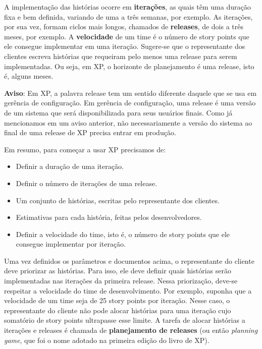 \documentclass[
  11pt,
  twoside]{book}
\begin{document}
 A implementação das histórias
ocorre em \textbf{iterações}, as quais têm uma duração fixa e bem
definida, variando de uma a três semanas, por exemplo. As iterações, por
sua vez, formam ciclos mais longos, chamados de \textbf{releases}, de
dois a três meses, por exemplo. A \textbf{velocidade} de um time é o
número de story points que ele consegue implementar em uma iteração.
Sugere-se que o representante dos clientes escreva histórias que
requeiram pelo menos uma release para serem implementadas. Ou seja, em
XP, o horizonte de planejamento é uma release, isto é, alguns meses.

\textbf{Aviso}: Em XP, a palavra release tem um sentido diferente
daquele que se usa em gerência de configuração. Em gerência de
configuração, uma release é uma versão de um sistema que será
disponibilizada para seus usuários finais. Como já mencionamos em um
aviso anterior, não necessariamente a versão do sistema ao final de uma
release de XP precisa entrar em produção.

Em resumo, para começar a usar XP precisamos de:

\begin{itemize}
\item
  Definir a duração de uma iteração.
\item
  Definir o número de iterações de uma release.
\item
  Um conjunto de histórias, escritas pelo representante dos clientes.
\item
  Estimativas para cada história, feitas pelos desenvolvedores.
\item
  Definir a velocidade do time, isto é, o número de story points que ele
  consegue implementar por iteração.
\end{itemize}

Uma vez definidos os parâmetros e documentos acima, o representante do
cliente deve priorizar as histórias. Para isso, ele deve definir quais
histórias serão implementadas nas iterações da primeira release. Nessa
priorização, deve-se respeitar a velocidade do time de desenvolvimento.
Por exemplo, suponha que a velocidade de um time seja de 25 story points
por iteração. Nesse caso, o representante do cliente não pode alocar
histórias para uma iteração cujo somatório de story points ultrapasse
esse limite. A tarefa de alocar histórias a iterações e releases é
chamada de \textbf{planejamento de releases} (ou então \emph{planning
game}, que foi o nome adotado na primeira edição do livro de XP).
\end{document}
